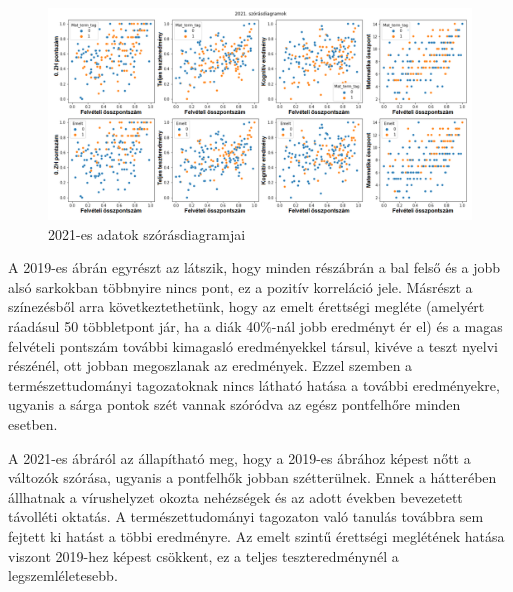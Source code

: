 \documentclass[12pt]{article}
\begin{document}
\begin{figure}[H]
\centering
\includegraphics[width=\textwidth]{kepek/2021scatter.png}
\caption{2021-es adatok szórásdiagramjai}
\label{fig:2021scatter}
\end{figure}

A 2019-es ábrán egyrészt az látszik, hogy minden részábrán a bal felső és a jobb alsó sarkokban többnyire nincs pont, ez a pozitív korreláció jele. Másrészt a színezésből arra következtethetünk, hogy az emelt érettségi megléte (amelyért ráadásul 50 többletpont jár, ha a diák 40\%-nál jobb eredményt ér el) és a magas felvételi pontszám további kimagasló eredményekkel társul, kivéve a teszt nyelvi részénél, ott jobban megoszlanak az eredmények. Ezzel szemben a természettudományi tagozatoknak nincs látható hatása a további eredményekre, ugyanis a sárga pontok szét vannak szóródva az egész pontfelhőre minden esetben.

A 2021-es ábráról az állapítható meg, hogy a 2019-es ábrához képest nőtt a változók szórása, ugyanis a pontfelhők jobban szétterülnek. Ennek a hátterében állhatnak a vírushelyzet okozta nehézségek és az adott években bevezetett távolléti oktatás. A természettudományi tagozaton való tanulás továbbra sem fejtett ki hatást a többi eredményre. Az emelt szintű érettségi meglétének hatása viszont 2019-hez képest csökkent, ez a teljes teszteredménynél a legszemléletesebb.
\end{document}
